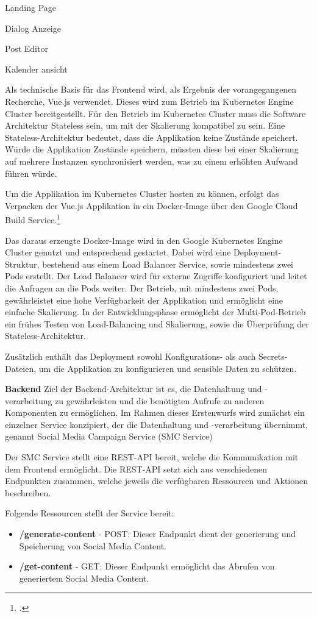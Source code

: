 Landing Page

Dialog Anzeige

Post Editor

Kalender ansicht

Als technische Basis für das Frontend wird, als Ergebnis der vorangegangenen Recherche, Vue.js verwendet.
Dieses wird zum Betrieb im Kubernetes Engine Cluster bereitgestellt.
Für den Betrieb im Kubernetes Cluster muss die Software Architektur Stateless sein, um mit der Skalierung kompatibel zu sein.
Eine Stateless-Architektur bedeutet, dass die Applikation keine Zustände speichert.
Würde die Applikation Zustände speichern, müssten diese bei einer Skalierung auf mehrere Instanzen synchronisiert werden, was zu einem erhöhten Aufwand führen würde.

Um die Applikation im Kubernetes Cluster hosten zu können, erfolgt das Verpacken der Vue.js Applikation in ein Docker-Image über den Google Cloud Build Service.\footcite{google_cloud_build}

Das daraus erzeugte Docker-Image wird in den Google Kubernetes Engine Cluster genutzt und entsprechend gestartet.
Dabei wird eine Deployment-Struktur, bestehend aus einem Load Balancer Service, sowie mindestens zwei Pods erstellt.
Der Load Balancer wird für externe Zugriffe konfiguriert und leitet die Anfragen an die Pods weiter.
Der Betrieb, mit mindestens zwei Pods, gewährleistet eine hohe Verfügbarkeit der Applikation und ermöglicht eine einfache Skalierung.
In der Entwicklungsphase ermöglicht der Multi-Pod-Betrieb ein frühes Testen von Load-Balancing und Skalierung, sowie die Überprüfung der Stateless-Architektur.

Zusätzlich enthält das Deployment sowohl Konfigurations- als auch Secrets-Dateien, um die Applikation zu konfigurieren und sensible Daten zu schützen.

\textbf{Backend}
Ziel der Backend-Architektur ist es, die Datenhaltung und -verarbeitung zu gewährleisten und die benötigten Aufrufe zu anderen Komponenten zu ermöglichen.
Im Rahmen dieses Erstenwurfs wird zunächst ein einzelner Service konzipiert, der die Datenhaltung und -verarbeitung übernimmt, genannt Social Media Campaign Service (SMC Service)

Der SMC Service stellt eine REST-API bereit, welche die Kommunikation mit dem Frontend ermöglicht.
Die REST-API setzt sich aus verschiedenen Endpunkten zusammen, welche jeweils die verfügbaren Ressourcen und Aktionen beschreiben.

Folgende Ressourcen stellt der Service bereit:
\begin{itemize}
    \item \textbf{/generate-content} - POST: Dieser Endpunkt dient der generierung und Speicherung von Social Media Content.
    \item \textbf{/get-content} - GET: Dieser Endpunkt ermöglicht das Abrufen von generiertem Social Media Content.
\end{itemize}

